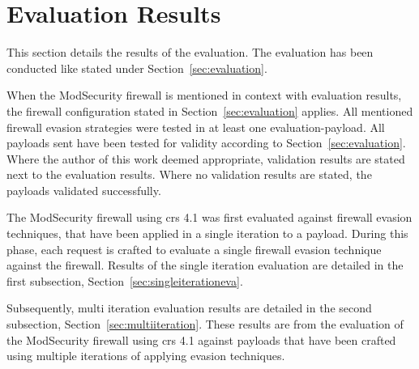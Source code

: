 \section{Evaluation Results}
\label{sec:EvaluationResults}
This section details the results of the evaluation. The evaluation has been conducted like stated under Section~\ref{sec:evaluation}. 

When the ModSecurity firewall is mentioned in context with evaluation results, the firewall configuration stated in Section~\ref{sec:evaluation} applies. 
All mentioned firewall evasion strategies were tested in at least one evaluation-payload.
All payloads sent have been tested for validity according to Section~\ref{sec:evaluation}.
Where the author of this work deemed appropriate, validation results are stated next to the evaluation results. Where no validation results are stated, the payloads validated successfully.

The ModSecurity firewall using \acrshort{crs} 4.1 was first evaluated against firewall evasion techniques, that have been applied in a single iteration to a payload. During this phase, each request is crafted to evaluate a single firewall evasion technique against the firewall. Results of the single iteration evaluation are detailed in the first subsection, Section~\ref{sec:singleiterationeva}. 

Subsequently, multi iteration evaluation results are detailed in the second subsection, Section~\ref{sec:multiiteration}. These results are from the evaluation of the ModSecurity firewall using \acrshort{crs} 4.1 against payloads that have been crafted using multiple iterations of applying evasion techniques.

%

